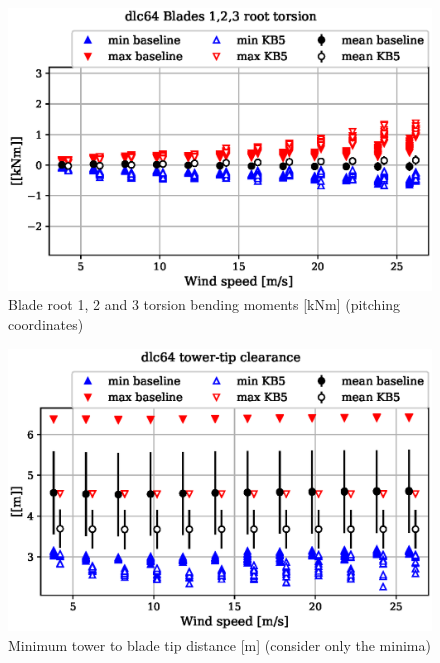 \begin{figure}[!ht]
\begin{center}
	\includegraphics[width=.85\linewidth]{figures/baseline-vs-KB6/dlc64/blade1-blade1-node-001-momentvec-z_AA0007_AA0003.eps}
\end{center}
\caption{Blade root 1, 2 and 3 torsion bending moments [kNm] (pitching coordinates)}
\label{fig:baseline-vs-KB6:dlc64:blade-root-torsion}
\end{figure}

\begin{figure}[!ht]
\begin{center}
	\includegraphics[width=.85\linewidth]{figures/baseline-vs-KB6/dlc64/DLL-towerclearance_mblade-inpvec-1_AA0007_AA0003.eps}
\end{center}
\caption{Minimum tower to blade tip distance [m] (consider only the minima)}
\label{fig:baseline-vs-KB6:dlc64:tower-tip-clearance}
\end{figure}

